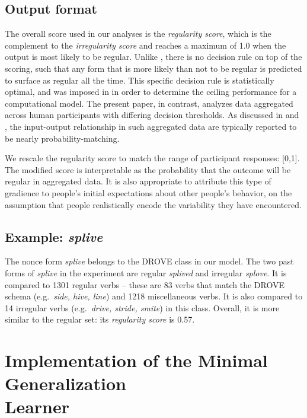 \documentclass[12pt]{article}
\begin{document}
\subsection{Output format \label{gcm_scale}}

The overall score used in our analyses is the {\em regularity score}, which is the complement to the {\em irregularity score} and reaches a maximum of 1.0 when the output is most likely to be regular. Unlike \cite{dawdy2014learnability}, there is no decision rule on top of the scoring, such that any form that is more likely than not to be regular is predicted to surface as regular all the time. This specific decision rule is statistically optimal, and was imposed in \cite{dawdy2014learnability} in order to determine the ceiling performance for a computational model. The present paper, in contrast, analyzes data aggregated across human participants with differing decision thresholds. As discussed in \cite{schumacher2014reconciling} and \cite{schumacher2017prior}, the input-output relationship in such aggregated data are typically reported to be nearly probability-matching. 

We rescale the regularity score to match the range of participant responses: [0,1]. The modified score is interpretable as the probability that the outcome will be regular in aggregated data. It is also appropriate to attribute this type of gradience to people's initial expectations about other people's behavior, on the assumption that people realistically encode the variability they have encountered.

\subsection{Example: {\em splive}}


The nonce form {\em splive} belongs to the DROVE class in our model. The two past forms of {\em splive} in the experiment are regular {\em splived} and irregular {\em splove}. It is compared to 1301 regular verbs -- these are 83 verbs that match the DROVE schema (e.g.\ {\em side, hive, line}) and 1218 miscellaneous verbs. It is also compared to 14 irregular verbs (e.g.\ {\em drive, stride, smite}) in this class. Overall, it is more similar to the regular set: its {\em regularity score} is 0.57.   

\section{Implementation of the Minimal Generalization \\ Learner}\label{appendixmgl}
\end{document}
